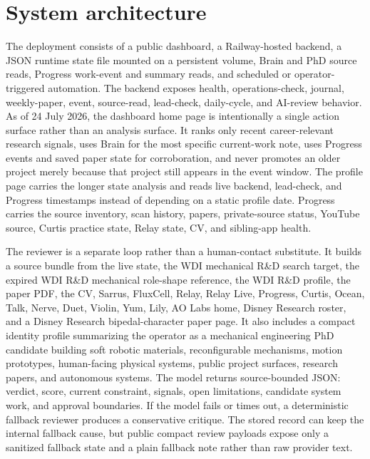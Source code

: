 \documentclass[12pt,letterpaper]{article}
\begin{document}
\section{System architecture}

The deployment consists of a public dashboard, a Railway-hosted backend, a JSON runtime state file mounted on a persistent volume, Brain and PhD source reads, Progress work-event and summary reads, and scheduled or operator-triggered automation. The backend exposes health, operations-check, journal, weekly-paper, event, source-read, lead-check, daily-cycle, and AI-review behavior. As of 24 July 2026, the dashboard home page is intentionally a single action surface rather than an analysis surface. It ranks only recent career-relevant research signals, uses Brain for the most specific current-work note, uses Progress events and saved paper state for corroboration, and never promotes an older project merely because that project still appears in the event window. The profile page carries the longer state analysis and reads live backend, lead-check, and Progress timestamps instead of depending on a static profile date. Progress carries the source inventory, scan history, papers, private-source status, YouTube source, Curtis practice state, Relay state, CV, and sibling-app health.

The reviewer is a separate loop rather than a human-contact substitute. It builds a source bundle from the live state, the WDI mechanical R\&D search target, the expired WDI R\&D mechanical role-shape reference, the WDI R\&D profile, the paper PDF, the CV, Sarrus, FluxCell, Relay, Relay Live, Progress, Curtis, Ocean, Talk, Nerve, Duet, Violin, Yum, Lily, AO Labs home, Disney Research roster, and a Disney Research bipedal-character paper page. It also includes a compact identity profile summarizing the operator as a mechanical engineering PhD candidate building soft robotic materials, reconfigurable mechanisms, motion prototypes, human-facing physical systems, public project surfaces, research papers, and autonomous systems. The model returns source-bounded JSON: verdict, score, current constraint, signals, open limitations, candidate system work, and approval boundaries. If the model fails or times out, a deterministic fallback reviewer produces a conservative critique. The stored record can keep the internal fallback cause, but public compact review payloads expose only a sanitized fallback state and a plain fallback note rather than raw provider text.
\end{document}
